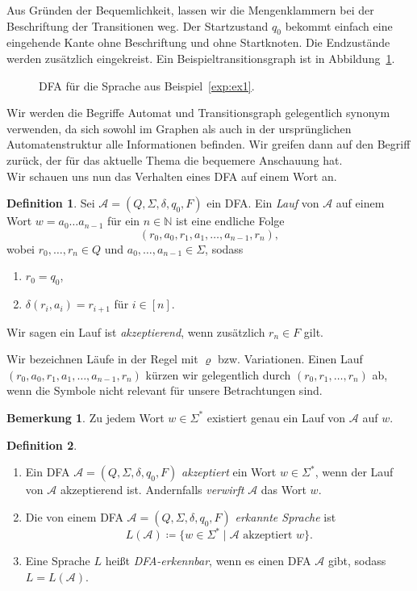 \documentclass[11pt, a4paper]{article}
\theoremstyle{definition}
\newtheorem{definition}{Definition}[section]
\newtheorem*{remark*}{Bemerkung}
\theoremstyle{plain}
\numberwithin{equation}{section}
\begin{document}
Aus Gründen der Bequemlichkeit, lassen wir die Mengenklammern bei der Beschriftung der Transitionen weg. Der Startzustand \( q_0 \) bekommt einfach eine eingehende Kante ohne Beschriftung und ohne Startknoten. Die Endzustände werden zusätzlich eingekreist. Ein Beispieltransitionsgraph ist in Abbildung~\ref{fig:dfa_ex1}.
\begin{figure}
	\centering
	
	\caption{DFA für die Sprache aus Beispiel~\ref{exp:ex1}.}
	\label{fig:dfa_ex1}
\end{figure}
Wir werden die Begriffe Automat und Transitionsgraph gelegentlich synonym verwenden, da sich sowohl im Graphen als auch in der ursprünglichen Automatenstruktur alle Informationen befinden. Wir greifen dann auf den Begriff zurück, der für das aktuelle Thema die bequemere Anschauung hat.\\
Wir schauen uns nun das Verhalten eines DFA auf einem Wort an.
\begin{definition}
	Sei \( \mathcal{A} = (Q, \Sigma, \delta, q_0, F) \) ein DFA.
	Ein \textit{Lauf} von \( \mathcal{A} \) auf einem Wort \( w = a_0 \ldots a_{n-1} \) für ein \( n \in \mathbb{N} \) ist eine endliche Folge
	\[
		(r_0, a_0, r_1, a_1, \ldots, a_{n-1}, r_n),
	\]
	wobei \( r_0, \ldots, r_n \in Q \) und \( a_0, \ldots, a_{n-1} \in \Sigma \), sodass
	\begin{enumerate}
		\item \( r_0 = q_0 \),
		\item \( \delta(r_i, a_i) = r_{i+1} \) für \( i \in [n] \).
	\end{enumerate}
	Wir sagen ein Lauf ist \textit{akzeptierend}, wenn zusätzlich \( r_n \in F \) gilt.
\end{definition}
Wir bezeichnen Läufe in der Regel mit \( \varrho \) bzw. Variationen. Einen Lauf \( (r_0, a_0, r_1, a_1, \ldots, a_{n-1}, r_n) \) kürzen wir gelegentlich durch \( (r_0, r_1, \ldots, r_n) \) ab, wenn die Symbole nicht relevant für unsere Betrachtungen sind.
\begin{remark*}
	Zu jedem Wort \( w \in \Sigma^\ast \) existiert genau ein Lauf von \( \mathcal{A} \) auf \( w \).
\end{remark*}
\begin{definition}
\
	\begin{enumerate}
		\item Ein DFA \( \mathcal{A} = (Q, \Sigma, \delta, q_0, F) \) \textit{akzeptiert} ein Wort \( w \in \Sigma^\ast \), wenn der Lauf von \( \mathcal{A} \) akzeptierend ist. Andernfalls \textit{verwirft} \( \mathcal{A} \) das Wort \( w \).
		\item Die von einem DFA \( \mathcal{A} = (Q, \Sigma, \delta, q_0, F) \) \textit{erkannte Sprache} ist
			\[
				L(\mathcal{A}) \coloneqq \{ w \in \Sigma^\ast \mid \mathcal{A} \text{ akzeptiert } w \}.
			\]
		\item Eine Sprache \( L \) heißt \textit{DFA-erkennbar}, wenn es einen DFA \( \mathcal{A} \) gibt, sodass \( L = L(\mathcal{A}) \).
	\end{enumerate}
\end{definition}
\end{document}
